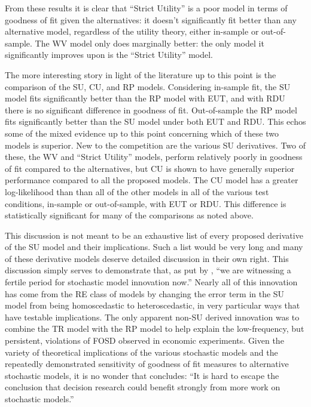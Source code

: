 \documentclass[../main.tex]{subfiles}
\begin{document}
From these results it is clear that \enquote{Strict Utility} is a poor model in terms of goodness of fit given the alternatives: it doesn't significantly fit better than any alternative model, regardless of the utility theory, either in-sample or out-of-sample.
The WV model only does marginally better: the only model it significantly improves upon is the \enquote{Strict Utility} model.

The more interesting story in light of the literature up to this point is the comparison of the SU, CU, and RP models.
Considering in-sample fit, the SU model fits significantly better than the RP model with EUT, and with RDU there is no significant difference in goodness of fit.
Out-of-sample the RP model fits  significantly better than the SU model under both EUT and RDU.
This echos some of the mixed evidence up to this point concerning which of these two models is superior.
New to the competition are the various SU derivatives.
Two of these, the WV and \enquote{Strict Utility} models, perform relatively poorly in goodness of fit compared to the alternatives, but CU is shown to have generally superior performance compared to all the proposed models.
The CU model has a greater log-likelihood than than all of the other models in all of the various test conditions, in-sample or out-of-sample, with EUT or RDU.
This difference is statistically significant for many of the comparisons as noted above.

This discussion is not meant to be an exhaustive list of every proposed derivative of the SU model and their implications.
Such a list would be very long and many of these derivative models deserve detailed discussion in their own right.
This discussion simply serves to demonstrate that, as put by \textcite[277]{Wilcox2008}, \enquote{we are witnessing a fertile period for stochastic model innovation now.}
Nearly all of this innovation has come from the RE class of models by changing the error term in the SU model from being homoscedastic to heteroscedastic, in very particular ways that have testable implications.
The only apparent non-SU derived innovation was to combine the TR model with the RP model to help explain the low-frequency, but persistent, violations of FOSD observed in economic experiments.{\footnotemark}
Given the variety of theoretical implications of the various stochastic models and the repeatedly demonstrated sensitivity of goodness of fit measures to alternative stochastic models, it is no wonder that \textcite[275]{Wilcox2008} concludes: \enquote{It is hard to escape the conclusion that decision research could benefit strongly from more work on stochastic models.}
\end{document}
